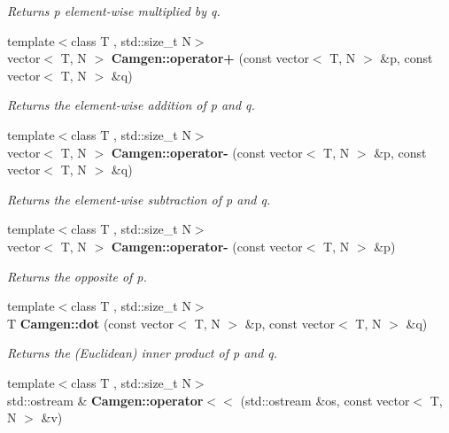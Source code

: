 \begin{DoxyCompactItemize}
\begin{DoxyCompactList}\small\item\em Returns p element-\/wise multiplied by q. \end{DoxyCompactList}\item 
\hypertarget{a00849_a3c27a507e22beba92beb7bb95918ca55}{{\footnotesize template$<$class T , std\-::size\-\_\-t N$>$ }\\vector$<$ T, N $>$ {\bfseries Camgen\-::operator+} (const vector$<$ T, N $>$ \&p, const vector$<$ T, N $>$ \&q)}\label{a00849_a3c27a507e22beba92beb7bb95918ca55}

\begin{DoxyCompactList}\small\item\em Returns the element-\/wise addition of p and q. \end{DoxyCompactList}\item 
\hypertarget{a00849_aecb2ec65494e235a9612ee3a0aa8d82f}{{\footnotesize template$<$class T , std\-::size\-\_\-t N$>$ }\\vector$<$ T, N $>$ {\bfseries Camgen\-::operator-\/} (const vector$<$ T, N $>$ \&p, const vector$<$ T, N $>$ \&q)}\label{a00849_aecb2ec65494e235a9612ee3a0aa8d82f}

\begin{DoxyCompactList}\small\item\em Returns the element-\/wise subtraction of p and q. \end{DoxyCompactList}\item 
\hypertarget{a00849_aca382570fc4587c321288db3aa9d6db0}{{\footnotesize template$<$class T , std\-::size\-\_\-t N$>$ }\\vector$<$ T, N $>$ {\bfseries Camgen\-::operator-\/} (const vector$<$ T, N $>$ \&p)}\label{a00849_aca382570fc4587c321288db3aa9d6db0}

\begin{DoxyCompactList}\small\item\em Returns the opposite of p. \end{DoxyCompactList}\item 
\hypertarget{a00849_a4edf9f4a232c5b25cf0506f1e6b38a0c}{{\footnotesize template$<$class T , std\-::size\-\_\-t N$>$ }\\T {\bfseries Camgen\-::dot} (const vector$<$ T, N $>$ \&p, const vector$<$ T, N $>$ \&q)}\label{a00849_a4edf9f4a232c5b25cf0506f1e6b38a0c}

\begin{DoxyCompactList}\small\item\em Returns the (Euclidean) inner product of p and q. \end{DoxyCompactList}\item 
\hypertarget{a00849_abff9233b14623333b2939868ef957e60}{{\footnotesize template$<$class T , std\-::size\-\_\-t N$>$ }\\std\-::ostream \& {\bfseries Camgen\-::operator$<$$<$} (std\-::ostream \&os, const vector$<$ T, N $>$ \&v)}\label{a00849_abff9233b14623333b2939868ef957e60}


\end{DoxyCompactItemize}
